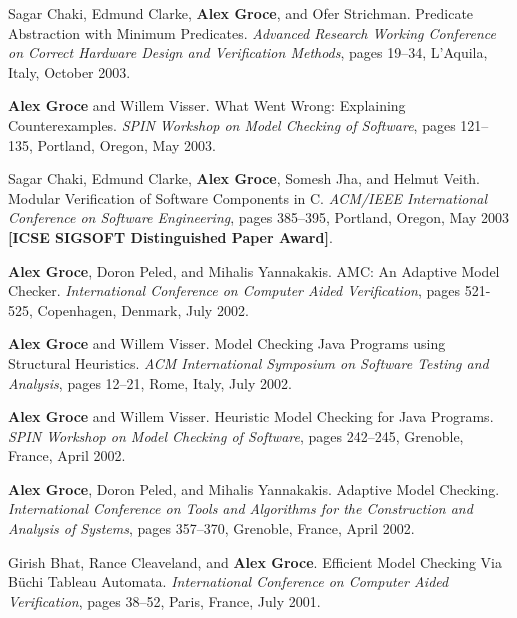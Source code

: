 \documentclass[ComputerScience]{vita}
\begin{document}
\begin{vita}
\begin{Refereed Conference and Workshop Publications}
\item
Sagar Chaki, Edmund Clarke, {\bf Alex Groce}, and Ofer Strichman.
\newblock Predicate Abstraction with Minimum Predicates.
\newblock \emph{Advanced Research Working Conference on Correct Hardware Design and Verification Methods}, pages 19--34, L'Aquila, Italy, October 2003.


\item
{\bf Alex Groce} and Willem Visser.
\newblock What Went Wrong: Explaining Counterexamples.
\newblock \emph{SPIN Workshop on Model Checking of Software}, pages 121--135, Portland, Oregon, May 2003.

\item 
Sagar Chaki, Edmund Clarke, {\bf Alex Groce}, Somesh Jha, and Helmut Veith.
\newblock Modular Verification of Software Components in C.
\newblock \emph{ACM/IEEE International Conference on Software Engineering}, pages 385--395, Portland, Oregon, May 2003 {\bf [ICSE SIGSOFT Distinguished Paper Award]}.

\item
{\bf Alex Groce}, Doron Peled, and Mihalis Yannakakis.
\newblock AMC: An Adaptive Model Checker.
\newblock \emph{International Conference on Computer Aided Verification}, pages 521-525, Copenhagen, Denmark, July 2002.

\item
{\bf Alex Groce} and Willem Visser.
\newblock Model Checking Java Programs using Structural Heuristics.
\newblock \emph{ACM International Symposium on Software Testing and Analysis}, pages 12--21, Rome, Italy, July 2002.

\item
{\bf Alex Groce} and Willem Visser.
\newblock Heuristic Model Checking for Java Programs.
\newblock \emph{SPIN Workshop on Model Checking of Software}, pages 242--245, Grenoble, France, April 2002.

\item
{\bf Alex Groce}, Doron Peled, and Mihalis Yannakakis.
\newblock Adaptive Model Checking.
\newblock \emph{International Conference on Tools and Algorithms for the Construction and Analysis of Systems}, pages 357--370, Grenoble, France, April 2002.

\item
Girish Bhat, Rance Cleaveland, and {\bf Alex Groce}.
\newblock Efficient Model Checking Via B\"uchi Tableau Automata.
\newblock \emph{International Conference on Computer Aided Verification}, pages 38--52, Paris, France, July 2001.
\end{Refereed Conference and Workshop Publications}


\end{vita}
\end{document}
